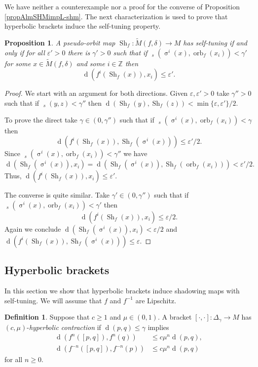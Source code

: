\documentclass[12pt]{amsart}
\DeclareMathOperator{\shift}{\sigma}
\theoremstyle{plain}
\newtheorem{prop}[thm]{Proposition}
\theoremstyle{definition}
\newtheorem{df}[thm]{Definition}
\theoremstyle{remark}
\DeclareMathOperator{\dist}{d}
\DeclareMathOperator{\tdist}{\tilde{d}}
\DeclareMathOperator{\orb}{orb}
\DeclareMathOperator{\shm}{Sh}
\newcommand{\Z}{\mathbb Z}
\renewcommand{\epsilon}{\varepsilon}
\newcommand{\tM}{\tilde{M}}
\begin{document}
We have neither a counterexample nor a proof for the converse of Proposition \ref{propAlmSHMimpL-shm}. The next characterization is used to prove that hyperbolic brackets induce the self-tuning property.

\begin{prop}
	\label{propCharAlmShInvShm}
	A pseudo-orbit map $\shm_f\colon \tM(f,\delta)\to M$ has self-tuning if and only if for all $\epsilon'>0$ there is $\gamma'>0$ such that if
	$\tdist_s(\shift^i(x),\orb_f(x_i))<\gamma'$ for some $x\in \tM(f,\delta)$ and some $i\in\Z$ then
	\begin{equation}
		\label{ecuAShInv2}
		\dist(f^i(\shm_f(x)),x_i)\leq\epsilon'.
	\end{equation}
\end{prop}

\begin{proof}
	We start with an argument for both directions.
	Given $\epsilon,\epsilon'>0$ take $\gamma''>0$ such that
	if $\tdist_s(y,z)<\gamma''$ then
	$\dist(\shm_f(y),\shm_f(z))<\min\{\epsilon,\epsilon'\}/2$.

	To prove the direct take $\gamma\in(0,\gamma'')$ such that if
	$\tdist_s(\shift^i(x),\orb_f(x_i))<\gamma$ then
	$$\dist(f^i(\shm_f(x)),\shm_f(\shift^i(x)))\leq\epsilon'/2.$$
	Since
	$\tdist_s(\shift^i(x),\orb_f(x_i))<\gamma''$ we have
	$$\dist(\shm_f(\shift^i(x)),x_i)=
	\dist(\shm_f(\shift^i(x)),\shm_f(\orb_f(x_i)))<\epsilon'/2.$$
	Thus, $\dist(f^i(\shm_f(x)),x_i)\leq\epsilon'$.

	The converse is quite similar.
	Take $\gamma'\in(0,\gamma'')$ such that if
	$\tdist_s(\shift^i(x),\orb_f(x_i))<\gamma'$ then
	$$\dist(f^i(\shm_f(x)),x_i)\leq\epsilon/2.$$
	Again we conclude $\dist(\shm_f(\shift^i(x)),x_i)<\epsilon/2$ and
	$\dist(f^i(\shm_f(x)),\shm_f(\shift^i(x)))\leq\epsilon$.
\end{proof}

\subsection{Hyperbolic brackets}
\label{secHyperbolic brackets}
In this section we show that hyperbolic brackets induce shadowing maps with self-tuning.
We will assume that $f$ and $f^{-1}$ are Lipschitz.

\begin{df}
	Suppose that $c\geq 1$ and $\mu\in(0,1)$.
	A bracket $[\cdot,\cdot]\colon\Delta_{\gamma}\to M$ has $(c,\mu)$-\textit{hyperbolic contraction} if $\dist(p,q)\leq\gamma$ implies
	\begin{align*}
		\dist(f^n([p,q]),f^n(q))      &\leq c\mu^n\dist(p,q),\\
		\dist(f^{-n}([p,q]),f^{-n}(p))&\leq c\mu^n\dist(p,q)
	\end{align*}
	for all $n\geq 0$.
\end{df}
\end{document}
